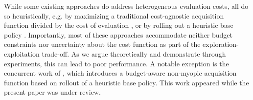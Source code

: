 While some existing approaches do address heterogeneous evaluation costs, all do so heuristically, e.g. by maximizing a traditional cost-agnostic acquisition function divided by the cost of evaluation \citep{Snoek2012ML,poloczek2017multi,wu2020practical,lee2020cost}, or by rolling out a heuristic base policy \citep{lee2021}. Importantly, most of these approaches accommodate neither budget constraints nor uncertainty about the cost function as part of the exploration-exploitation trade-off. As we argue theoretically and demonstrate through experiments, this can lead to poor performance. A notable exception is the concurrent work of \cite{lee2021}, which introduces a budget-aware non-myopic acquisition function based on rollout of a heuristic base policy. This work appeared while the present paper was under review. %



